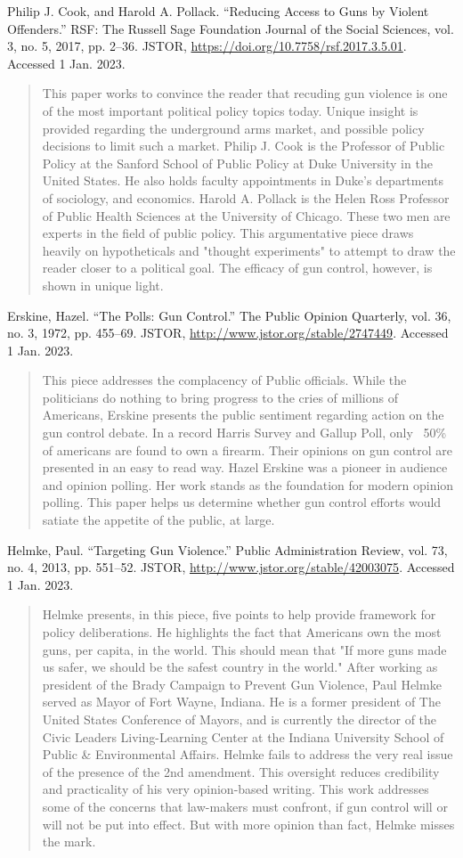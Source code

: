 \documentclass [12pt]{article}
\newcommand{\bibent}{\noindent \hangindent 40pt}
\newcommand{\bibannote}{\begin{quotation}}
\newcommand{\bibendote}{\end{quotation}}
\begin{document}
\bibent Philip J. Cook, and Harold A. Pollack. “Reducing Access to Guns by Violent Offenders.” RSF: The Russell Sage Foundation Journal of the Social Sciences, vol. 3, no. 5, 2017, pp. 2–36. JSTOR, \url{https://doi.org/10.7758/rsf.2017.3.5.01}. Accessed 1 Jan. 2023.
\bibannote
This paper works to convince the reader that recuding gun violence is one of the most important political policy topics today. Unique insight is provided regarding the underground arms market, and possible policy decisions to limit such a market. Philip J. Cook is the Professor of Public Policy at the Sanford School of Public Policy at Duke University in the United States. He also holds faculty appointments in Duke's departments of sociology, and economics. Harold A. Pollack is the Helen Ross Professor of Public Health Sciences at the University of Chicago. These two men are experts in the field of public policy. This argumentative piece draws heavily on hypotheticals and "thought experiments" to attempt to draw the reader closer to a political goal. The efficacy of gun control, however, is shown in unique light. 
\bibendote

\bibent Erskine, Hazel. “The Polls: Gun Control.” The Public Opinion Quarterly, vol. 36, no. 3, 1972, pp. 455–69. JSTOR, \url{http://www.jstor.org/stable/2747449}. Accessed 1 Jan. 2023.
\bibannote
This piece addresses the complacency of Public officials. While the politicians do nothing to bring progress to the cries of millions of Americans, Erskine presents the public sentiment regarding action on the gun control debate. In a record Harris Survey and Gallup Poll, only ~50\% of americans are found to own a firearm. Their opinions on gun control are presented in an easy to read way. Hazel Erskine was a pioneer in audience and opinion polling. Her work stands as the foundation for modern opinion polling. This paper helps us determine whether gun control efforts would satiate the appetite of the public, at large. 
\bibendote

\bibent Helmke, Paul. “Targeting Gun Violence.” Public Administration Review, vol. 73, no. 4, 2013, pp. 551–52. JSTOR, \url{http://www.jstor.org/stable/42003075}. Accessed 1 Jan. 2023.
\bibannote
Helmke presents, in this piece, five points to help provide framework for policy deliberations. He highlights the fact that Americans own the most guns, per capita, in the world. This should mean that "If more guns made us safer, we should be the safest country in the world." After working as president of the Brady Campaign to Prevent Gun Violence, Paul Helmke served as Mayor of Fort Wayne, Indiana. He is a former president of The United States Conference of Mayors, and is currently the director of the Civic Leaders Living-Learning Center at the Indiana University School of Public \& Environmental Affairs. Helmke fails to address the very real issue of the presence of the 2nd amendment. This oversight reduces credibility and practicality of his very opinion-based writing. This work addresses some of the concerns that law-makers must confront, if gun control will or will not be put into effect. But with more opinion than fact, Helmke misses the mark.
\bibendote
\end{document}
